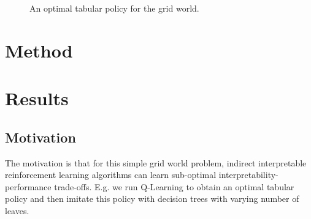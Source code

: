 \begin{figure}[ht]
\centering
{}
\caption{An optimal tabular policy for the grid world.}\label{fig:optimal-policy}
\end{figure}

\section{Method}
\section{Results}
\subsection{Motivation}
The motivation is that for this simple grid world problem, indirect interpretable reinforcement learning algorithms can learn sub-optimal interpretability-performance trade-offs. E.g. we run Q-Learning to obtain an optimal tabular policy and then imitate this policy with decision trees with varying number of leaves. 

